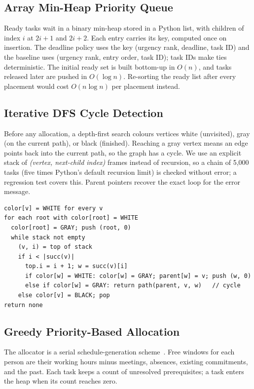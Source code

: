 \documentclass[sigconf,nonacm]{acmart}
\begin{document}
\subsection{Array Min-Heap Priority Queue}
Ready tasks wait in a binary min-heap stored in a Python list, with children of index $i$ at
$2i{+}1$ and $2i{+}2$. Each entry carries its key, computed once on insertion. The
deadline policy uses the key (urgency rank, deadline, task ID) and the baseline uses
(urgency rank, entry order, task ID); task IDs make ties deterministic. The initial ready set
is built bottom-up in $O(n)$, and tasks released later are pushed in $O(\log n)$. Re-sorting
the ready list after every placement would cost $O(n \log n)$ per placement instead.

\subsection{Iterative DFS Cycle Detection}
Before any allocation, a depth-first search colours vertices white (unvisited), gray (on the
current path), or black (finished). Reaching a gray vertex means an edge points back into
the current path, so the graph has a cycle. We use an explicit stack of
\textit{(vertex, next-child index)} frames instead of recursion, so a chain of 5{,}000 tasks (five times Python's default recursion limit) is checked without
error; a regression test covers this. Parent pointers
recover the exact loop for the error message.

\begin{lstlisting}[style=pseudo]
color[v] = WHITE for every v
for each root with color[root] = WHITE
  color[root] = GRAY; push (root, 0)
  while stack not empty
    (v, i) = top of stack
    if i < |succ(v)|
      top.i = i + 1; w = succ(v)[i]
      if color[w] = WHITE: color[w] = GRAY; parent[w] = v; push (w, 0)
      else if color[w] = GRAY: return path(parent, v, w)   // cycle
    else color[v] = BLACK; pop
return none
\end{lstlisting}

\subsection{Greedy Priority-Based Allocation}
The allocator is a serial schedule-generation scheme~\cite{kolisch1996}. Free windows for
each person are their working hours minus meetings, absences, existing commitments, and the
past. Each task keeps a count of unresolved prerequisites; a task enters the heap when its
count reaches zero.
\end{document}
